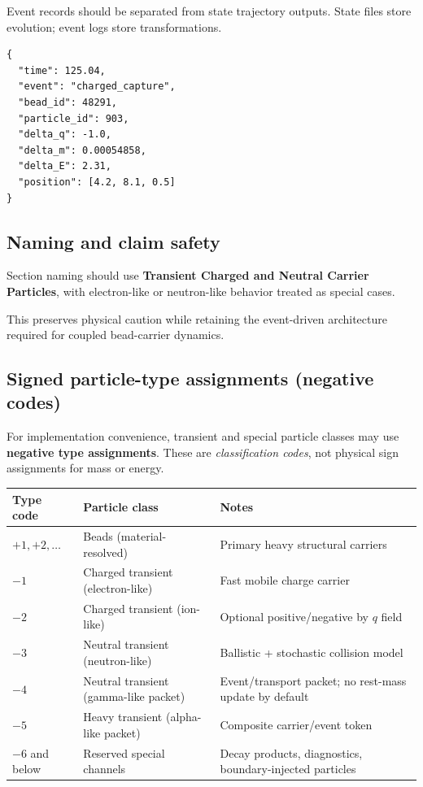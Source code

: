 \documentclass[11pt, a4paper, oneside]{article}
\begin{document}
Event records should be separated from state trajectory outputs.
State files store evolution; event logs store transformations.

\begin{verbatim}
{
  "time": 125.04,
  "event": "charged_capture",
  "bead_id": 48291,
  "particle_id": 903,
  "delta_q": -1.0,
  "delta_m": 0.00054858,
  "delta_E": 2.31,
  "position": [4.2, 8.1, 0.5]
}
\end{verbatim}

\subsection{Naming and claim safety}

Section naming should use
\textbf{Transient Charged and Neutral Carrier Particles},
with electron-like or neutron-like behavior treated as special cases.

This preserves physical caution while retaining the event-driven
architecture required for coupled bead-carrier dynamics.

\subsection{Signed particle-type assignments (negative codes)}

For implementation convenience, transient and special particle classes may use
\textbf{negative type assignments}. These are \emph{classification codes},
not physical sign assignments for mass or energy.

\begin{center}
\begin{tabular}{lll}
\toprule
Type code & Particle class & Notes \\
\midrule
$+1, +2, \ldots$ & Beads (material-resolved) & Primary heavy structural carriers \\
$-1$ & Charged transient (electron-like) & Fast mobile charge carrier \\
$-2$ & Charged transient (ion-like) & Optional positive/negative by $q$ field \\
$-3$ & Neutral transient (neutron-like) & Ballistic + stochastic collision model \\
$-4$ & Neutral transient (gamma-like packet) & Event/transport packet; no rest-mass update by default \\
$-5$ & Heavy transient (alpha-like packet) & Composite carrier/event token \\
$-6$ and below & Reserved special channels & Decay products, diagnostics, boundary-injected particles \\
\bottomrule
\end{tabular}
\end{center}
\end{document}
